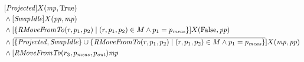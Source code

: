 \begin{enumerate}
\begin{align*}
        &[\mathit{Projected}]X(\mathit{mp}, \text{True})\\
        &\wedge [\mathit{SwapIdle}]X(\mathit{pp}, \mathit{mp})\\
        &\wedge [\{\mathit{RMoveFromTo}(r, p_1, p_2) \mid (r, p_1, p_2) \in M \wedge p_1 = p_\mathit{meas}\}]X(\text{False}, \mathit{pp})\\
        &\wedge [\overline{\{\mathit{Projected}, \mathit{SwapIdle}\} \cup \{\mathit{RMoveFromTo}(r, p_1, p_2) \mid (r, p_1, p_2) \in M \wedge p_1 = p_\mathit{meas}\}}]X(\mathit{mp}, \mathit{pp})\\
        &\wedge [\mathit{RMoveFromTo}(r_3, p_\mathit{meas}, p_\mathit{out})\mathit{mp}
    \end{align*}
\end{enumerate}